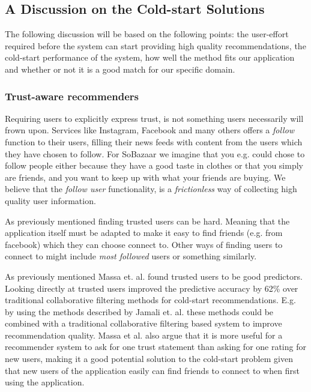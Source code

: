 \subsection{A Discussion on the Cold-start Solutions}
\label{sec:cold-start-discussion}

The following discussion will be based on the following points: the user-effort
required before the system can start providing high quality recommendations, the
cold-start performance of the system, how well the method fits our application
and whether or not it is a good match for our specific domain.

\subsubsection{Trust-aware recommenders}

Requiring users to explicitly express trust, is not something users necessarily
will frown upon. Services like Instagram, Facebook and many others offers a
\emph{follow} function to their users, filling their news feeds with content from
the users which they have chosen to follow. For SoBazaar we imagine that you
e.g. could chose to follow people either because they have a good taste in
clothes or that you simply are friends, and you want to keep up with what your
friends are buying. We believe that the \emph{follow user} functionality, is
a \emph{frictionless} way of collecting high quality user information.

As previously mentioned finding trusted users can be hard. Meaning that the
application itself must be adapted to make it easy to find friends (e.g. from facebook)
which they can choose connect to. Other ways of finding users to connect to might
include \emph{most followed} users or something similarly.

As previously mentioned Massa et. al. \cite{Massa2007} found trusted users
to be good predictors. Looking directly at trusted users improved the
predictive accuracy by 62\% over traditional collaborative filtering methods
for cold-start recommendations. E.g. by using the methods described by
Jamali et. al. \cite{Jamali2009} these methods could be combined with a traditional collaborative
filtering based system to improve recommendation quality. Massa et al. \cite{Massa2004} also argue that it is more
useful for a recommender system to ask for one trust statement than asking for
one rating for new users, making it a good potential solution to the cold-start
problem given that new users of the application easily can find friends
to connect to when first using the application.

